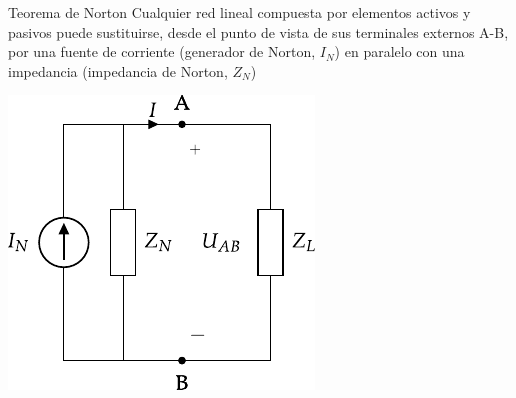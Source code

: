 \documentclass[aspectratio=169, usenames,svgnames,dvipsnames]{beamer}
\begin{document}
\begin{frame}{Teorema de Norton}
    \vspace{3mm}
    Cualquier \alert{red lineal} compuesta por elementos activos y pasivos puede sustituirse, desde el punto de vista de sus terminales externos A-B, por una \alert{fuente de corriente} (generador de Norton, \(I_N\)) en \alert{paralelo} con una impedancia (impedancia de Norton, \(Z_N\))

    \vspace{2mm}
    \begin{center}
        \includegraphics[height=0.6\textheight]{../figs/EquivalenteNorton.pdf}
    \end{center}
\end{frame}

\end{document}
